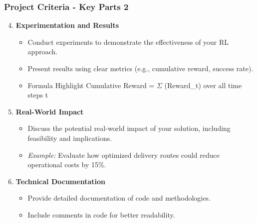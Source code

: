 \documentclass[aspectratio=169]{beamer}
\begin{document}
\begin{frame}[fragile]
    \frametitle{Project Criteria - Key Parts 2}
    \begin{enumerate}
        \setcounter{enumi}{3} %

        \item \textbf{Experimentation and Results}
        \begin{itemize}
            \item Conduct experiments to demonstrate the effectiveness of your RL approach.
            \item Present results using clear metrics (e.g., cumulative reward, success rate).
            \item \begin{block}{Formula Highlight}
                Cumulative Reward = $\Sigma$ (Reward\_t) over all time steps t
            \end{block}
        \end{itemize}

        \item \textbf{Real-World Impact}
        \begin{itemize}
            \item Discuss the potential real-world impact of your solution, including feasibility and implications.
            \item \textit{Example:} Evaluate how optimized delivery routes could reduce operational costs by 15\%.
        \end{itemize}

        \item \textbf{Technical Documentation}
        \begin{itemize}
            \item Provide detailed documentation of code and methodologies.
            \item Include comments in code for better readability.
        \end{itemize}
    \end{enumerate}
\end{frame}
\end{document}
